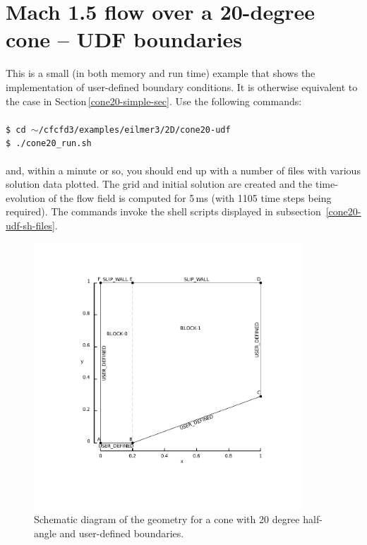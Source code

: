 
\section{Mach 1.5 flow over a 20-degree cone -- UDF boundaries}
\label{sec:cone20-udf}
%
This is a small (in both memory and run time) example 
that shows the implementation of user-defined boundary conditions.
It is otherwise equivalent to the case in Section\,\ref{cone20-simple-sec}.
Use the following commands:\\
%
\topbar\\
\texttt{\$ cd $\sim$/cfcfd3/examples/eilmer3/2D/cone20-udf}\\
\texttt{\$ ./cone20\_run.sh}\\
\bottombar\\
%
and, within a minute or so, you should end up with a number of files
with various solution data plotted.
The grid and initial solution are created and the time-evolution of the
flow field is computed for 5\,ms (with 1105 time steps being required).
The commands invoke the shell scripts displayed in 
subsection~\ref{cone20-udf-sh-files}.
%

\begin{figure}[htbp]
\begin{center}
\includegraphics[width=10cm, viewport=76 78 389 398]{../2D/cone20-udf/cone20_svg.pdf}
\end{center}
\caption{Schematic diagram of the geometry for a cone 
         with 20 degree half-angle and user-defined boundaries.}
\label{cone20-udf-geometry-fig}
\end{figure}

